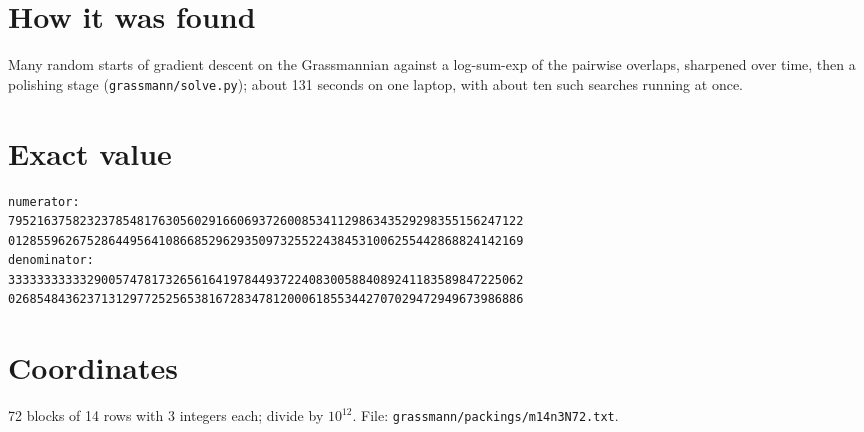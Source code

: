 \documentclass[11pt,a4paper]{article}
\begin{document}
\section{How it was found}
Many random starts of gradient descent on the Grassmannian against a log-sum-exp of the pairwise overlaps, sharpened over time, then a polishing stage (\texttt{grassmann/solve.py}); about 131 seconds on one laptop, with about ten such searches running at once.


\appendix
\section{Exact value}
{\small
\begin{verbatim}
numerator:
795216375823237854817630560291660693726008534112986343529298355156247122
012855962675286449564108668529629350973255224384531006255442868824142169
denominator:
333333333332900574781732656164197844937224083005884089241183589847225062
026854843623713129772525653816728347812000618553442707029472949673986886
\end{verbatim}}

\section{Coordinates}
72 blocks of 14 rows with 3 integers each; divide by $10^{12}$. File: \texttt{grassmann/packings/m14n3N72.txt}.
{\tiny
\begin{multicols}{3}
\end{multicols}}
\end{document}
